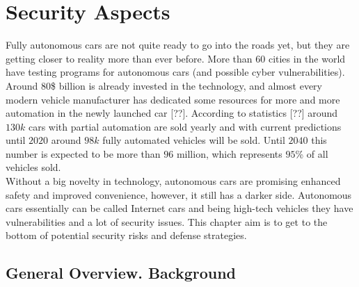\chapter{Security Aspects}
\label{chap:5}
%
Fully autonomous cars are not quite ready to go into the roads yet, but they are getting closer to reality more than ever before. More than $60$ cities in the world have testing programs for autonomous cars (and possible cyber vulnerabilities). Around $80$\$ billion is already invested in the technology, and almost every modern vehicle manufacturer has dedicated some resources for more and more automation in the newly launched car [??].  According to statistics [??] around $130k$ cars with partial automation are sold yearly and with current predictions until $2020$ around $98k$ fully automated vehicles will be sold. Until $2040$ this number is expected to be more than $96$ million, which represents $95$\% of all vehicles sold. \\
Without a big novelty in technology, autonomous cars are promising enhanced safety and improved convenience, however, it still has a darker side. Autonomous cars essentially can be called Internet cars and being high-tech vehicles they have vulnerabilities and a lot of security issues. This chapter aim is to get to the bottom of potential security risks and defense strategies.

\section{General Overview. Background}

